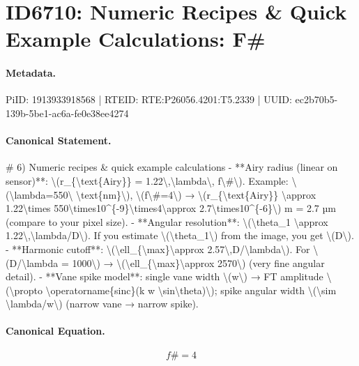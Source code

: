 \section*{ID6710: Numeric Recipes \& Quick Example Calculations: F\#}
\paragraph{Metadata.}
PiID: 1913933918568 | RTEID: RTE:P26056.4201:T5.2339 | UUID: ec2b70b5-139b-5be1-ac6a-fe0e38ee4274

\paragraph{Canonical Statement.}
\# 6) Numeric recipes \& quick example calculations - **Airy radius (linear on sensor)**: \textbackslash{}(r\_\{\textbackslash{}text\{Airy\}\} = 1.22\textbackslash{},\textbackslash{}lambda\textbackslash{}, f\textbackslash{}\#\textbackslash{}). Example: \textbackslash{}(\textbackslash{}lambda=550\textbackslash{} \textbackslash{}text\{nm\}\textbackslash{}), \textbackslash{}(f\textbackslash{}\#=4\textbackslash{}) → \textbackslash{}(r\_\{\textbackslash{}text\{Airy\}\} \textbackslash{}approx 1.22\textbackslash{}times 550\textbackslash{}times10\textasciicircum{}\{-9\}\textbackslash{}times4\textbackslash{}approx 2.7\textbackslash{}times10\textasciicircum{}\{-6\}\textbackslash{}) m = 2.7 µm (compare to your pixel size). - **Angular resolution**: \textbackslash{}(\textbackslash{}theta\_1 \textbackslash{}approx 1.22\textbackslash{},\textbackslash{}lambda/D\textbackslash{}). If you estimate \textbackslash{}(\textbackslash{}theta\_1\textbackslash{}) from the image, you get \textbackslash{}(D\textbackslash{}). - **Harmonic cutoff**: \textbackslash{}(\textbackslash{}ell\_\{\textbackslash{}max\}\textbackslash{}approx 2.57\textbackslash{},D/\textbackslash{}lambda\textbackslash{}). For \textbackslash{}(D/\textbackslash{}lambda = 1000\textbackslash{}) → \textbackslash{}(\textbackslash{}ell\_\{\textbackslash{}max\}\textbackslash{}approx 2570\textbackslash{}) (very fine angular detail). - **Vane spike model**: single vane width \textbackslash{}(w\textbackslash{}) → FT amplitude \textbackslash{}(\textbackslash{}propto \textbackslash{}operatorname\{sinc\}(k w \textbackslash{}sin\textbackslash{}theta)\textbackslash{}); spike angular width \textbackslash{}(\textbackslash{}sim \textbackslash{}lambda/w\textbackslash{}) (narrow vane → narrow spike).

\paragraph{Canonical Equation.}
\[
f\#=4
\]

